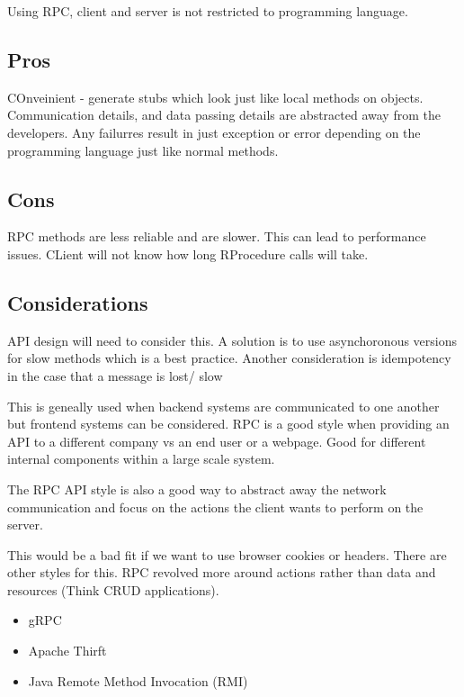 \documentclass[a4paper, 11pt]{book}
\begin{document}
    Using RPC, client and server is not restricted to programming language.

    \subsection{Pros}
    COnveinient - generate stubs which look just like local methods on objects.
    Communication details, and data passing details are abstracted away from the developers.
    Any failurres result in just exception or error depending on the programming language just like normal methods.

    \subsection{Cons}
    RPC methods are less reliable and are slower. This can lead to performance issues.
    CLient will not know how long RProcedure calls will take.

    \subsection{Considerations}
    API design will need to consider this.
    A solution is to use asynchoronous versions for slow methods which is a best practice.
    Another consideration is idempotency in the case that a message is lost/ slow

    This is geneally used when backend systems are communicated to one another but frontend systems can be considered.
    RPC is a good style when providing an API to a different company vs an end user or a webpage.
    Good for different internal components within a large scale system.

    The RPC API style is also a good way to abstract away the network communication and focus on the actions the client wants to perform on the server.

    This would be a bad fit if we want to use browser cookies or headers. There are other styles for this.
    RPC revolved more around actions rather than data and resources (Think CRUD applications).


    \begin{itemize}
        \item gRPC
        \item Apache Thirft
        \item Java Remote Method Invocation (RMI)
    \end{itemize}
\end{document}
